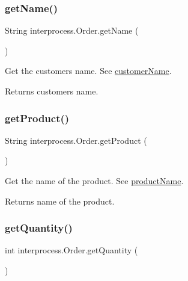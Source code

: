 \subsubsection{\texorpdfstring{get\+Name()}{getName()}}
{\footnotesize\ttfamily String interprocess.\+Order.\+get\+Name (\begin{DoxyParamCaption}{ }\end{DoxyParamCaption})\hspace{0.3cm}{\ttfamily [inline]}}

Get the customer\textquotesingle{}s name. See \hyperlink{classinterprocess_1_1_order_a15fc1e10e5935f82493a68ebd9ef1a55}{customer\+Name}. \begin{DoxyReturn}{Returns}
customer\textquotesingle{}s name. 
\end{DoxyReturn}
\mbox{\label{classinterprocess_1_1_order_a06e815c40a345dcedbed2765784de66b}} 
\subsubsection{\texorpdfstring{get\+Product()}{getProduct()}}
{\footnotesize\ttfamily String interprocess.\+Order.\+get\+Product (\begin{DoxyParamCaption}{ }\end{DoxyParamCaption})\hspace{0.3cm}{\ttfamily [inline]}}

Get the name of the product. See \hyperlink{classinterprocess_1_1_order_ab22f659fd57c8bde1b362e7054d63f61}{product\+Name}. \begin{DoxyReturn}{Returns}
name of the product. 
\end{DoxyReturn}
\mbox{\label{classinterprocess_1_1_order_ad38dbbe0a5126da82d8078b8b3295ce9}} 
\subsubsection{\texorpdfstring{get\+Quantity()}{getQuantity()}}
{\footnotesize\ttfamily int interprocess.\+Order.\+get\+Quantity (\begin{DoxyParamCaption}{ }\end{DoxyParamCaption})\hspace{0.3cm}{\ttfamily [inline]}}

